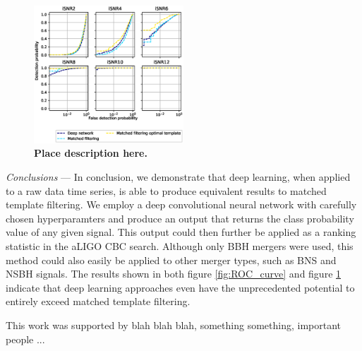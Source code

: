 \documentclass[%
 amsmath,amssymb,
 aps,
 twocolumn,
floatfix,
]{revtex4-1}
\begin{document}
\begin{figure}[]
 \includegraphics[width=0.5\textwidth]
 {figures/ROC_curves.eps}
 \caption{\label{fig:isnr_curves} \textbf{Place description here.}}
\end{figure}

\textit{Conclusions} --- In conclusion, we demonstrate that deep learning, when applied to a raw data time series, is able to produce equivalent results to matched template filtering. We employ a deep convolutional neural network with carefully chosen hyperparamters and produce an output that returns the class probability value of any given signal. This output could then further be applied as a ranking statistic in the aLIGO CBC search. Although only BBH mergers were used, this method could also easily be applied to other merger types, such as BNS and NSBH signals. The results shown in both figure \ref{fig:ROC_curve} and figure \ref{fig:isnr_curves} indicate that deep learning approaches even have the unprecedented potential to entirely exceed matched template filtering. 

This work was supported by blah blah blah, something something, important people ... 



\nocite{*}

\end{document}
